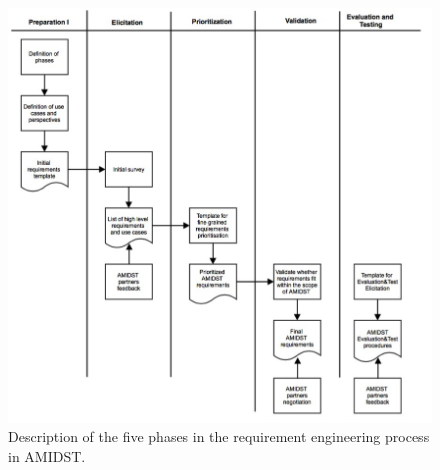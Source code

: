 \begin{figure}
\centering
\includegraphics [keepaspectratio,width = 14cm] {REprocess1}
\caption{Description of the five phases in the requirement engineering process in AMIDST.}
\label{REprocess1}
\end{figure}
